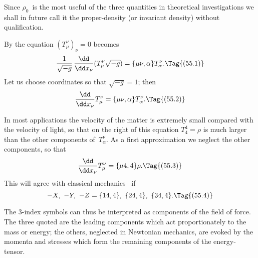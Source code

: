 \documentclass[12pt]{book}
\begin{document}
Since $\rho_{0}$~is the most useful of the three quantities in theoretical investigations
we shall in future call it the proper-density (or invariant density)
without qualification.

%

By  the equation $(T_{\mu}^{\nu})_{\nu} = 0$ becomes
\[
\frac{1}{\sqrt{-g}}\, \frac{\dd}{\dd x_{\nu}}(T_{\mu}^{\nu} \sqrt{-g})
= \{\mu\nu, \alpha\} T_{\alpha}^{\nu}.
\Tag{(55.1)}
\]
Let us choose coordinates so that $\sqrt{-g} = 1$; then
\[
\frac{\dd}{\dd x_{\nu}}T_{\mu}^{\nu} = \{\mu\nu, \alpha\} T_{\alpha}^{\nu}.
\Tag{(55.2)}
\]

In most applications the velocity of the matter is extremely small compared
with the velocity of light, so that on the right of this equation $T_{4}^{4} = \rho$ is
much larger than the other components of~$T_{\alpha}^{\nu}$. As a first approximation we
neglect the other components, so that
\[
\frac{\dd}{\dd x_{\nu}} T_{\mu}^{\nu} = \{\mu4, 4\} \rho.
\Tag{(55.3)}
\]
This will agree with classical mechanics~ if
\[
-X,\ -Y,\ -Z = \{14, 4\},\ \{24, 4\},\ \{34, 4\}.
\Tag{(55.4)}
\]

The $3$-index symbols can thus be interpreted as components of the field
of force. The three quoted are the leading components which act proportionately
to the mass or energy; the others, neglected in Newtonian mechanics,
are evoked by the momenta and stresses which form the remaining components
of the energy-tensor.
\end{document}
